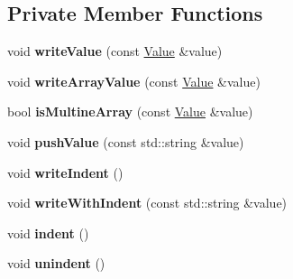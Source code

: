 \subsection*{Private Member Functions}
\begin{DoxyCompactItemize}
\item 
\hypertarget{class_json_1_1_styled_writer_ac40143cf43f7c4a94d3d0b41e5245069}{void {\bfseries write\-Value} (const \hyperlink{class_json_1_1_value}{Value} \&value)}\label{class_json_1_1_styled_writer_ac40143cf43f7c4a94d3d0b41e5245069}

\item 
\hypertarget{class_json_1_1_styled_writer_a0618c23d62965515def15ece1e677f5d}{void {\bfseries write\-Array\-Value} (const \hyperlink{class_json_1_1_value}{Value} \&value)}\label{class_json_1_1_styled_writer_a0618c23d62965515def15ece1e677f5d}

\item 
\hypertarget{class_json_1_1_styled_writer_aa5dc671edf10b9976f1511da2271ab9d}{bool {\bfseries is\-Multine\-Array} (const \hyperlink{class_json_1_1_value}{Value} \&value)}\label{class_json_1_1_styled_writer_aa5dc671edf10b9976f1511da2271ab9d}

\item 
\hypertarget{class_json_1_1_styled_writer_aba120a1ff1b84411b32039188e8fb49f}{void {\bfseries push\-Value} (const std\-::string \&value)}\label{class_json_1_1_styled_writer_aba120a1ff1b84411b32039188e8fb49f}

\item 
\hypertarget{class_json_1_1_styled_writer_a885f4bfb5701896d60eee6716d2db7e4}{void {\bfseries write\-Indent} ()}\label{class_json_1_1_styled_writer_a885f4bfb5701896d60eee6716d2db7e4}

\item 
\hypertarget{class_json_1_1_styled_writer_a7b3cc9da3cb455ee9b2752307ac21b58}{void {\bfseries write\-With\-Indent} (const std\-::string \&value)}\label{class_json_1_1_styled_writer_a7b3cc9da3cb455ee9b2752307ac21b58}

\item 
\hypertarget{class_json_1_1_styled_writer_a0b65be6186a7c6638270990265e42b97}{void {\bfseries indent} ()}\label{class_json_1_1_styled_writer_a0b65be6186a7c6638270990265e42b97}

\item 
\hypertarget{class_json_1_1_styled_writer_acee1c9285519b573cfcb00b7e7f5a809}{void {\bfseries unindent} ()}\label{class_json_1_1_styled_writer_acee1c9285519b573cfcb00b7e7f5a809}


\end{DoxyCompactItemize}
